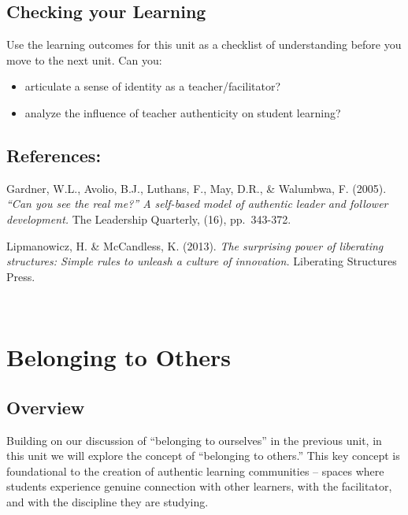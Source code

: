 \documentclass[
]{book}
\providecommand{\tightlist}{%
  \setlength{\itemsep}{0pt}\setlength{\parskip}{0pt}}
\begin{document}
\hypertarget{checking-your-learning-1}{%
\section*{Checking your Learning}\label{checking-your-learning-1}}

\begin{progress}
Use the learning outcomes for this unit as a checklist of understanding
before you move to the next unit. Can you:

\begin{itemize}
\tightlist
\item
  articulate a sense of identity as a teacher/facilitator?
\item
  analyze the influence of teacher authenticity on student learning?
\end{itemize}
\end{progress}

\hypertarget{references}{%
\section*{References:}\label{references}}

Gardner, W.L., Avolio, B.J., Luthans, F., May, D.R., \& Walumbwa, F. (2005). \emph{``Can you see the real me?'' A self-based model of authentic leader and follower development.} The Leadership Quarterly, (16), pp.~343-372.

Lipmanowicz, H. \& McCandless, K. (2013). \emph{The surprising power of liberating structures: Simple rules to unleash a culture of innovation.} Liberating Structures Press.

~

\hypertarget{belonging-to-others}{%
\chapter{Belonging to Others}\label{belonging-to-others}}

\hypertarget{overview-2}{%
\section*{Overview}\label{overview-2}}

Building on our discussion of ``belonging to ourselves'' in the previous
unit, in this unit we will explore the concept of ``belonging to others.''
This key concept is foundational to the creation of authentic learning
communities -- spaces where students experience genuine connection with
other learners, with the facilitator, and with the discipline they are
studying.
\end{document}
